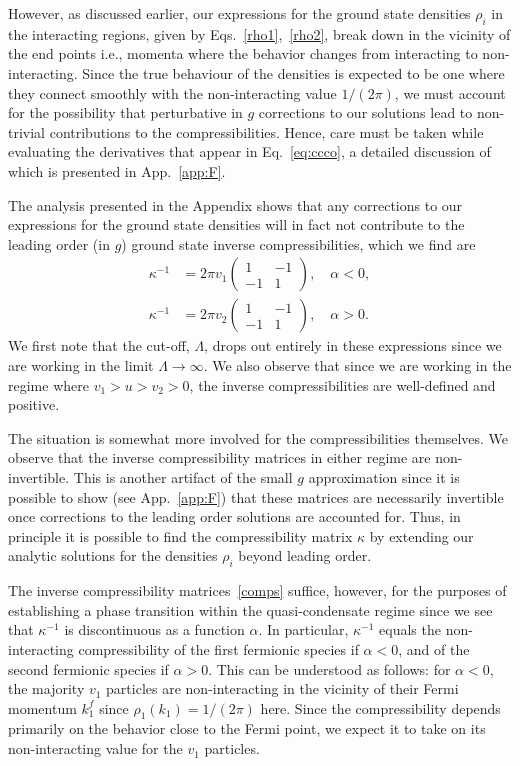 \documentclass[aps,pra,
superscriptaddress,
reprint,twocolumn,preprintnumbers,
amsmath,amssymb,
nofootinbib]{revtex4-1}
\begin{document}
However, as discussed earlier, our expressions for the ground state densities $\rho_i$ in the interacting regions, given by Eqs.~\eqref{rho1},~\eqref{rho2}, break down in the vicinity of the end points i.e., momenta where the behavior changes from interacting to non-interacting. Since the true behaviour of the densities is expected to be one where they connect smoothly with the non-interacting value $1/(2\pi)$, we must account for the possibility that perturbative in $g$ corrections to our solutions lead to non-trivial contributions to the compressibilities. Hence, care must be taken while evaluating the derivatives that appear in Eq.~\eqref{eq:ccco}, a detailed discussion of which is presented in App.~\ref{app:F}.

The analysis presented in the Appendix shows that any corrections to our expressions for the ground state densities will in fact not contribute to the leading order (in $g$) ground state inverse compressibilities, which we find are  
\begin{align}
\label{comps}
\kappa^{-1} &= 2 \pi v_1
\left( 
\begin{array}{cc}
1 & -1 \\
-1 & 1
\end{array}
\right),\quad \alpha<0, \nonumber \\
\kappa^{-1} &= 2 \pi v_2
\left( 
\begin{array}{cc}
1 & -1 \\
-1 & 1
\end{array}
\right),\quad \alpha>0.
\end{align}
We first note that the cut-off, $\Lambda$, drops out entirely in these expressions since we are working in the limit $\Lambda \to \infty$. We also observe that since we are working in the regime where $v_1>u>v_2>0$, the inverse compressibilities are well-defined and positive. 

The situation is somewhat more involved for the compressibilities themselves. We observe that the inverse compressibility matrices in either regime are non-invertible. This is another artifact of the small $g$ approximation since it is possible to show (see App.~\ref{app:F}) that these matrices are necessarily invertible once corrections to the leading order solutions are accounted for. Thus, in principle it is possible to find the compressibility matrix $\kappa$ by extending our analytic solutions for the densities $\rho_i$ beyond leading order.

The inverse compressibility matrices~\eqref{comps} suffice, however, for the purposes of establishing a phase transition within the quasi-condensate regime since we see that $\kappa^{-1}$ is discontinuous as a function $\alpha$. In particular, $\kappa^{-1}$ equals the non-interacting compressibility of the first fermionic species if $\alpha<0$, and of the second fermionic species if $\alpha>0$. This can be understood as follows: for $\alpha<0$, the majority $v_1$ particles are non-interacting in the vicinity of their Fermi momentum $k_1^f$ since $\rho_1(k_1) = 1/(2\pi)$ here. Since the compressibility depends primarily on the behavior close to the Fermi point, we expect it to take on its non-interacting value for the $v_1$ particles.
\end{document}
